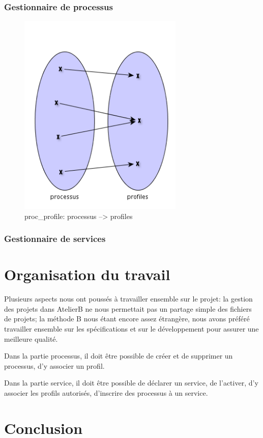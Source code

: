 \documentclass[french, titlepage, 11pt, a4paper]{article}
\begin{document}
\subsubsection{Gestionnaire de processus}

\begin{figure}[htb]
  \centering
  \includegraphics[width=0.7\textwidth]{proc_profile.png}
  \caption{proc\_profile: processus --> profiles}
  \label{fig:proc_profile}
\end{figure}

\subsubsection{Gestionnaire de services}

\section{Organisation du travail}
Plusieurs aspects nous ont poussés à travailler ensemble sur le projet: la
gestion des projets dans AtelierB ne nous permettait pas un partage simple des
fichiers de projets; la méthode B nous étant encore assez étrangère, nous avons
préféré travailler ensemble sur les spécifications et sur le développement pour
assurer une meilleure qualité.

Dans la partie processus, il doit être possible de créer et de supprimer un
processus, d'y associer un profil.

Dans la partie service, il doit être possible de déclarer un service, de
l'activer, d'y associer les profils autorisés, d'inscrire des processus à un
service.

\section{Conclusion}
\end{document}

